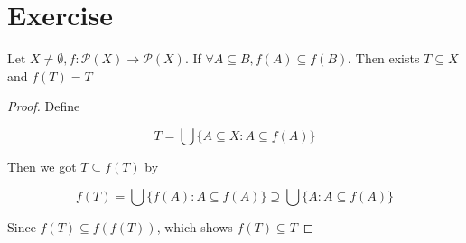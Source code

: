 \section{Exercise}

\begin{exercise}
    Let $X \ne \emptyset, f: \mathscr{P}(X) \to \mathscr{P}(X)$. If $\forall A \subseteq B, f(A) \subseteq f(B)$. Then
    exists $T \subseteq X$ and $f(T) = T$
\end{exercise}

\begin{proof}
   Define 

   \[
        T = \bigcup \{ A \subseteq X: A \subseteq f(A) \}
   \]

   Then we got $T \subseteq f(T)$ by

   \[
    f(T) = \bigcup \{ f(A): A \subseteq f(A) \} \supseteq  \bigcup \{ A: A \subseteq f(A) \}
   \]

   Since $f(T) \subseteq f(f(T))$, which shows $f(T) \subseteq T$

\end{proof}
